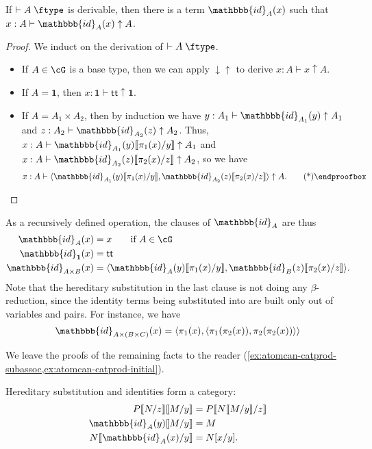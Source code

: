 \documentclass{book}
\let\types\vdash
\def\type{\;\ftype}
\newcommand{\can}{\mathrel{\uparrow}}
\newcommand{\atomcan}{\ensuremath{\mathord{\downarrow\uparrow}}}
\newcommand{\hsub}[1]{\llbracket #1\rrbracket}
\newcommand{\hid}[1]{\mathbbb{id}_{#1}}
\def\unit{\mathbf{1}}
\def\ttt{\mathsf{tt}}
\def\pair#1#2{\langle #1,#2\rangle}
\begin{document}
\begin{lem}\label{thm:catprod-atomcan-idadm}
  If $\types A\type$ is derivable, then there is a term $\hid{A}(x)$ such that $x:A \types \hid{A}(x)\can A$.
\end{lem}
\begin{proof}
  We induct on the derivation of $\types A\type$.
  \begin{itemize}
  \item If $A\in\cG$ is a base type, then we can apply $\atomcan$ to derive $x:A \types x\can A$.
  \item If $A=\unit$, then $x:\unit \types \ttt\can \unit$.
  \item If $A=A_1\times A_2$, then by induction we have $y:A_1 \types \hid{A_1}(y)\can A_1$ and $z:A_2 \types \hid{A_2}(z)\can A_2$.
    Thus, $x:A \types \hid{A_1}(y)\hsub{\pi_1(x)/y}\can A_1$ and $x:A \types \hid{A_2}(z)\hsub{\pi_2(x)/z}\can A_2$, so we have
    \[ x:A \types \pair{\hid{A_1}(y)\hsub{\pi_1(x)/y}}{\hid{A_2}(z)\hsub{\pi_2(x)/z}} \can A.\qedhere\]
  \end{itemize}
\end{proof}

As a recursively defined operation, the clauses of $\hid{A}$ are thus
\begin{align*}
  \hid{A}(x) &= x \qquad\text{if }{A\in\cG}\\
  \hid{\unit}(x) &= \ttt\\
  \hid{A\times B}(x) &= \pair{\hid{A}(y)\hsub{\pi_1(x)/y}}{\hid{B}(z)\hsub{\pi_2(x)/z}}.
\end{align*}
Note that the hereditary substitution in the last clause is not doing any $\beta$-reduction, since the identity terms being substituted into are built only out of variables and pairs.
For instance, we have
\[ \hid{A\times (B\times C)}(x) = \pair{\pi_1(x)}{\pair{\pi_1(\pi_2(x))}{\pi_2(\pi_2(x))}} \]

We leave the proofs of the remaining facts to the reader (\cref{ex:atomcan-catprod-subassoc,ex:atomcan-catprod-initial}).

\begin{lem}\label{thm:atomcan-catprod-subassoc}
  Hereditary substitution and identities form a category:
  \begin{align*}
    P\hsub{N/z}\hsub{M/y} &= P\hsub{N\hsub{M/y}/z}\\
    \hid{A}(y)\hsub{M/y} &= M\\
    N\hsub{\hid{A}(x)/y} &= N[x/y].\thmqedhere
  \end{align*}
\end{lem}
\end{document}
